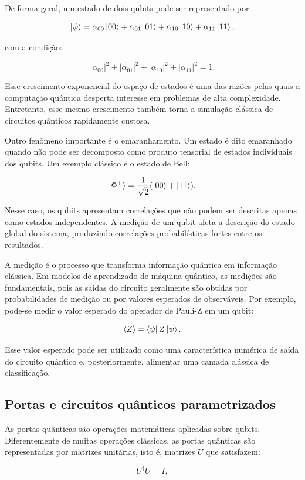 \documentclass[
    12pt,
    openright,
    oneside,
    a4paper,
    english,
    brazil
]{abntex2}
\begin{document}
De forma geral, um estado de dois qubits pode ser representado por:

\[
\ket{\psi} =
\alpha_{00}\ket{00}
+
\alpha_{01}\ket{01}
+
\alpha_{10}\ket{10}
+
\alpha_{11}\ket{11},
\]

com a condição:

\[
|\alpha_{00}|^2 +
|\alpha_{01}|^2 +
|\alpha_{10}|^2 +
|\alpha_{11}|^2 = 1.
\]

Esse crescimento exponencial do espaço de estados é uma das razões pelas quais a computação quântica desperta interesse em problemas de alta complexidade. Entretanto, esse mesmo crescimento também torna a simulação clássica de circuitos quânticos rapidamente custosa.

Outro fenômeno importante é o emaranhamento. Um estado é dito emaranhado quando não pode ser decomposto como produto tensorial de estados individuais dos qubits. Um exemplo clássico é o estado de Bell:

\[
\ket{\Phi^+} =
\frac{1}{\sqrt{2}}
(\ket{00} + \ket{11}).
\]

Nesse caso, os qubits apresentam correlações que não podem ser descritas apenas como estados independentes. A medição de um qubit afeta a descrição do estado global do sistema, produzindo correlações probabilísticas fortes entre os resultados.

A medição é o processo que transforma informação quântica em informação clássica. Em modelos de aprendizado de máquina quântico, as medições são fundamentais, pois as saídas do circuito geralmente são obtidas por probabilidades de medição ou por valores esperados de observáveis. Por exemplo, pode-se medir o valor esperado do operador de Pauli-Z em um qubit:

\[
\langle Z \rangle =
\bra{\psi} Z \ket{\psi}.
\]

Esse valor esperado pode ser utilizado como uma característica numérica de saída do circuito quântico e, posteriormente, alimentar uma camada clássica de classificação.

\subsection{Portas e circuitos quânticos parametrizados}

As portas quânticas são operações matemáticas aplicadas sobre qubits. Diferentemente de muitas operações clássicas, as portas quânticas são representadas por matrizes unitárias, isto é, matrizes \(U\) que satisfazem:

\[
U^\dagger U = I,
\]
\end{document}
